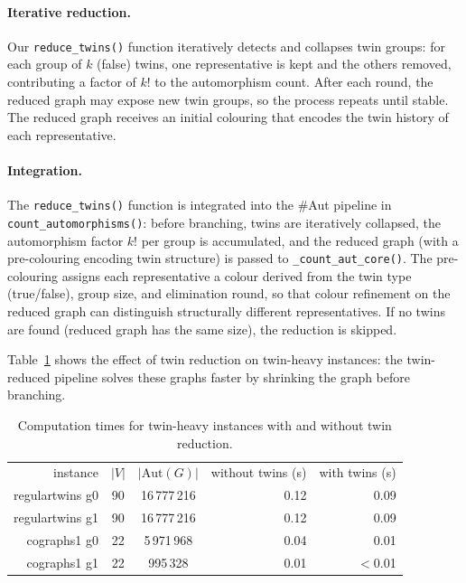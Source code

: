 \documentclass[twoside]{article}
\begin{document}
\paragraph{Iterative reduction.} Our \texttt{reduce\_twins()} function iteratively detects and collapses twin groups: for each group of $k$ (false) twins, one representative is kept and the others removed, contributing a factor of $k!$ to the automorphism count. After each round, the reduced graph may expose new twin groups, so the process repeats until stable. The reduced graph receives an initial colouring that encodes the twin history of each representative.

\paragraph{Integration.} The \texttt{reduce\_twins()} function is integrated into the \#Aut pipeline in \texttt{count\_automorphisms()}: before branching, twins are iteratively collapsed, the automorphism factor $k!$ per group is accumulated, and the reduced graph (with a pre-colouring encoding twin structure) is passed to \texttt{\_count\_aut\_core()}. The pre-colouring assigns each representative a colour derived from the twin type (true/false), group size, and elimination round, so that colour refinement on the reduced graph can distinguish structurally different representatives. If no twins are found (reduced graph has the same size), the reduction is skipped.

Table~\ref{tab:twins} shows the effect of twin reduction on twin-heavy instances: the twin-reduced pipeline solves these graphs faster by shrinking the graph before branching.

\begin{table}[H]
\centering
\begin{tabular}{r|c|c|r|r}
instance & $|V|$ & $|\text{Aut}(G)|$ & without twins (s) & with twins (s) \\
\noalign{\smallskip}\hline\hline\noalign{\smallskip}
regulartwins g0 & 90 & 16\,777\,216 & 0.12 & 0.09 \\
regulartwins g1 & 90 & 16\,777\,216 & 0.12 & 0.09 \\
cographs1 g0    & 22 &  5\,971\,968 & 0.04 & 0.01 \\
cographs1 g1    & 22 &    995\,328  & 0.01 & $<$0.01 \\
\end{tabular}
\caption{Computation times for twin-heavy instances with and without twin reduction.}\label{tab:twins}
\end{table}
\end{document}
